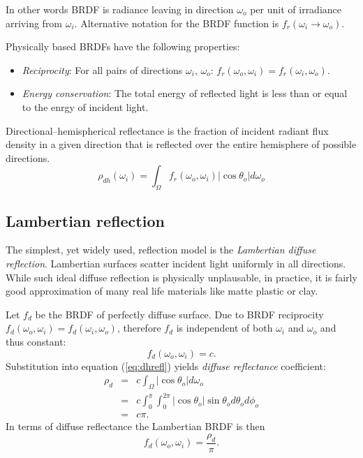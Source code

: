 In other words BRDF is radiance leaving in direction $\omega_{o}$ per unit of irradiance arriving from $\omega_{i}$. Alternative notation for the BRDF function is $f_{r}(\omega_{i} \rightarrow \omega_{o})$.

Physically based BRDFs have the following properties:
\begin{itemize}
\item \emph{Reciprocity}: For all pairs of directions $\omega_{i}$, $\omega_{o}$: $f_{r}(\omega_{o}, \omega_{i}) = f_{r}(\omega_{i}, \omega_{o})$.
\item \emph{Energy conservation}: The total energy of reflected light is less than or equal to the enrgy of incident light.
\end{itemize}

\begin{df}
Directional--hemispherical reflectance \parencite{sillion94} is the fraction of incident radiant flux density in a given direction that is reflected over the entire hemisphere of possible directions.
\begin{equation}
\label{eq:dhrefl}
  \rho_{dh}(\omega_{i}) = \int_{\Omega} f_{r}(\omega_{o}, \omega_{i}) |\cos\theta_{o}| d\omega_{o}
\end{equation}
\end{df}

\subsection{Lambertian reflection}
The simplest, yet widely used, reflection model is the \emph{Lambertian diffuse reflection}. Lambertian surfaces scatter incident light uniformly in all directions. While such ideal diffuse reflection is physically unplausable, in practice, it is fairly good approximation of many real life materials like matte plastic or clay.

Let $f_{d}$ be the BRDF of perfectly diffuse surface. Due to BRDF reciprocity $f_{d}(\omega_{o}, \omega_{i}) = f_{d}(\omega_{i}, \omega_{o})$, therefore $f_{d}$ is independent of both $\omega_{i}$ and $\omega_{o}$ and thus constant:
\begin{equation}
  f_{d}(\omega_{o}, \omega_{i}) = c.
\end{equation}
Substitution into equation (\ref{eq:dhrefl}) yields \emph{diffuse reflectance} coefficient:
\begin{eqnarray}
  \rho_{d} &=& c \int_{\Omega} |\cos\theta_{o}| d\omega_{o} \\
  &=& c \int_{0}^{\pi} \int_{0}^{2\pi} |\cos\theta_{o}| \sin\theta_{o} d\theta_{o} d\phi_{o} \\
  &=& c \pi.
\end{eqnarray}
In terms of diffuse reflectance the Lambertian BRDF is then
\begin{equation}
  f_{d}(\omega_{o}, \omega_{i}) = \frac{\rho_{d}}{\pi}.
\end{equation}

